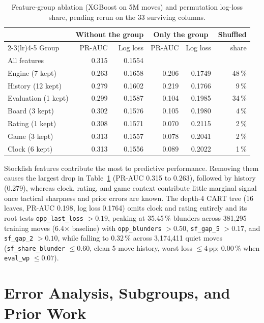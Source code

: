 \documentclass[a4paper,oneside,bibliography=totoc]{scrbook}
\newcommand{\staletable}{\color{BurntOrange}}
\begin{document}
\begin{table}[t!]
  \centering\scriptsize\setlength{\tabcolsep}{4pt}
  \caption{Feature-group ablation (XGBoost on 5M moves) and permutation log-loss share, pending rerun on the
    33 surviving columns.}
  \label{tab:ablation}
  \staletable
  \begin{tabular}{@{}lrrrrr@{}}
    \toprule
     & \multicolumn{2}{c}{Without the group} & \multicolumn{2}{c}{Only the group} & Shuffled \\
    \cmidrule(lr){2-3}\cmidrule(lr){4-5}
    Group & PR-AUC & Log loss & PR-AUC & Log loss & share \\
    \midrule
    All features & 0.315 & 0.1554 & & & \\
    Engine (7 kept) & 0.263 & 0.1658 & 0.206 & 0.1749 & 48\,\% \\
    History (12 kept) & 0.279 & 0.1602 & 0.219 & 0.1766 & 9\,\% \\
    Evaluation (1 kept) & 0.299 & 0.1587 & 0.104 & 0.1985 & 34\,\% \\
    Board (3 kept) & 0.302 & 0.1576 & 0.105 & 0.1980 & 4\,\% \\
    Rating (1 kept) & 0.308 & 0.1571 & 0.070 & 0.2115 & 2\,\% \\
    Game (3 kept) & 0.313 & 0.1557 & 0.078 & 0.2041 & 2\,\% \\
    Clock (6 kept) & 0.313 & 0.1556 & 0.089 & 0.2022 & 1\,\% \\
    \bottomrule
  \end{tabular}
\end{table}

Stockfish features contribute the most to predictive performance. Removing them causes the largest drop in
Table~\ref{tab:ablation} (PR-AUC 0.315 to 0.263), followed by history (0.279), whereas clock, rating, and
game context contribute little marginal signal once tactical sharpness and prior errors are known. The depth-4
CART tree (16 leaves, PR-AUC 0.198, log loss 0.1764) omits clock and rating entirely and its root tests
\texttt{opp\_last\_loss} $> 0.19$, peaking at
35.45\,\% blunders across 381,295 training moves (6.4$\times$ baseline) with \texttt{opp\_blunders} $> 0.50$,
\texttt{sf\_gap\_5} $> 0.17$, and \texttt{sf\_gap\_2} $> 0.10$, while falling to 0.32\,\% across 3,174,411
quiet moves (\texttt{sf\_share\_blunder} $\le 0.60$, clean 5-move history, worst loss $\le 4$\,pp; 0.00\,\%
when \texttt{eval\_wp} $\le 0.07$).

\section{Error Analysis, Subgroups, and Prior Work}
\label{sec:errors}
\end{document}
